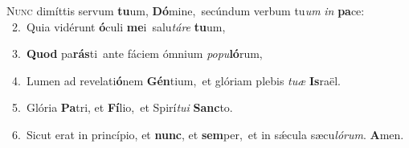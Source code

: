 \lettrine{\initial\textcolor{\initialcolor}{N}}{unc} dimíttis servum \textbf{tu}\-um, \textbf{Dó}\-mine,~\star secúndum verbum tu\textit{um} \textit{in} \textbf{pa}\-ce:\\
{\numbfont\textcolor{\numbcolor}{~2.}}~Quia vidérunt \textbf{ó}\-culi \textbf{me}\-i~\star salu\-\textit{tá}\-\textit{re} \textbf{tu}\-um,\par
{\numbfont\textcolor{\numbcolor}{~3.}}~\textbf{Quod} pa\-\textbf{rás}\-ti~\star ante fáciem ómnium \textit{po}\-\textit{pu}\textbf{ló}rum,\par
{\numbfont\textcolor{\numbcolor}{~4.}}~Lumen ad revelati\-\textbf{ó}\-nem \textbf{Gén}\-tium,~\star et glóriam plebis \textit{tu}\-\textit{æ} \textbf{Is}\-raël.\par
{\numbfont\textcolor{\numbcolor}{~5.}}~Glória \textbf{Pa}\-tri, et \textbf{Fí}\-lio,~\star et Spirí\-\textit{tu}\-\textit{i} \textbf{Sanc}\-to.\par
{\numbfont\textcolor{\numbcolor}{~6.}}~Sicut erat in princípio, et \textbf{nunc}\-, et \textbf{sem}\-per,~\star et in sǽcula sæcu\-\textit{ló}\-\textit{rum}. \textbf{A}\-men.\par

